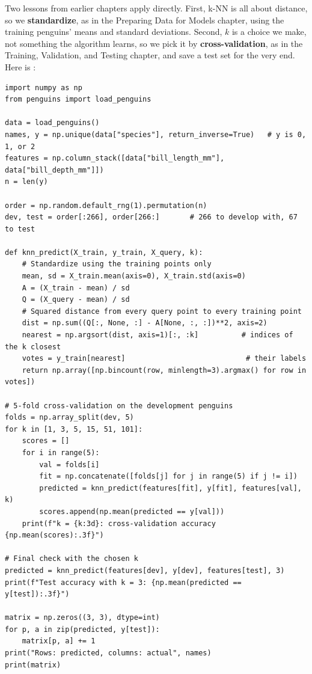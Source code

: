 Two lessons from earlier chapters apply directly. First, k-NN is all about distance, so we
\textbf{standardize}, as in the Preparing Data for Models chapter, using the training penguins' means and
standard deviations. Second, $k$ is a choice we make, not something the algorithm learns, so we pick it by
\textbf{cross-validation}, as in the Training, Validation, and Testing chapter, and save a test set for the
very end. Here is :

\begin{verbatim}
import numpy as np
from penguins import load_penguins

data = load_penguins()
names, y = np.unique(data["species"], return_inverse=True)   # y is 0, 1, or 2
features = np.column_stack([data["bill_length_mm"], data["bill_depth_mm"]])
n = len(y)

order = np.random.default_rng(1).permutation(n)
dev, test = order[:266], order[266:]       # 266 to develop with, 67 to test

def knn_predict(X_train, y_train, X_query, k):
    # Standardize using the training points only
    mean, sd = X_train.mean(axis=0), X_train.std(axis=0)
    A = (X_train - mean) / sd
    Q = (X_query - mean) / sd
    # Squared distance from every query point to every training point
    dist = np.sum((Q[:, None, :] - A[None, :, :])**2, axis=2)
    nearest = np.argsort(dist, axis=1)[:, :k]          # indices of the k closest
    votes = y_train[nearest]                            # their labels
    return np.array([np.bincount(row, minlength=3).argmax() for row in votes])

# 5-fold cross-validation on the development penguins
folds = np.array_split(dev, 5)
for k in [1, 3, 5, 15, 51, 101]:
    scores = []
    for i in range(5):
        val = folds[i]
        fit = np.concatenate([folds[j] for j in range(5) if j != i])
        predicted = knn_predict(features[fit], y[fit], features[val], k)
        scores.append(np.mean(predicted == y[val]))
    print(f"k = {k:3d}: cross-validation accuracy {np.mean(scores):.3f}")

# Final check with the chosen k
predicted = knn_predict(features[dev], y[dev], features[test], 3)
print(f"Test accuracy with k = 3: {np.mean(predicted == y[test]):.3f}")

matrix = np.zeros((3, 3), dtype=int)
for p, a in zip(predicted, y[test]):
    matrix[p, a] += 1
print("Rows: predicted, columns: actual", names)
print(matrix)
\end{verbatim}

